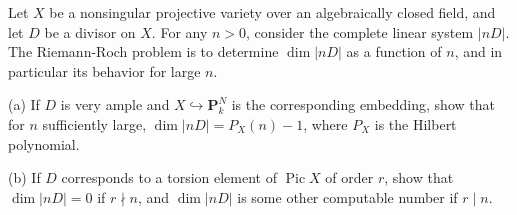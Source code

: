 Let $X$ be a nonsingular projective variety over an algebraically closed field, and let $D$ be a divisor on $X$. For any $n > 0$, consider the complete linear system $|nD|$. The Riemann-Roch problem is to determine $\dim|nD|$ as a function of $n$, and in particular its behavior for large $n$.

(a) If $D$ is very ample and $X \hookrightarrow \mathbf{P}_k^N$ is the corresponding embedding, show that for $n$ sufficiently large, $\dim|nD| = P_X(n) - 1$, where $P_X$ is the Hilbert polynomial.

(b) If $D$ corresponds to a torsion element of $\operatorname{Pic} X$ of order $r$, show that $\dim|nD| = 0$ if $r \nmid n$, and $\dim|nD|$ is some other computable number if $r \mid n$.
